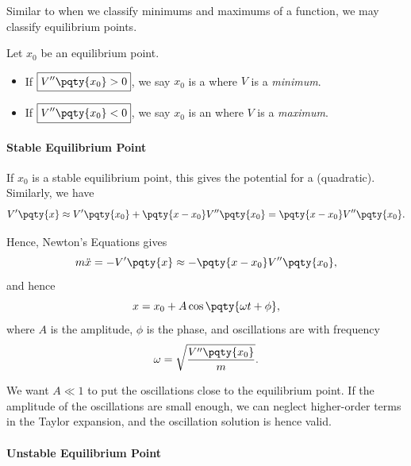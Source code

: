 Similar to when we classify minimums and maximums of a function, we may classify equilibrium points.

\begin{definition}
    \label{def:stable-unstable-equilibrium-points}%
    Let \(x_0\) be an equilibrium point.
    \begin{itemize}
        \item If \(\boxed{V''\pqty{x_0} > 0}\), we say \(x_0\) is a  where \(V\) is a \emph{minimum}.
        \item If \(\boxed{V''\pqty{x_0} < 0}\), we say \(x_0\) is an  where \(V\) is a \emph{maximum}.
    \end{itemize}
    
    
\end{definition}

\paragraph{Stable Equilibrium Point}

If \(x_0\) is a stable equilibrium point, this gives the potential for a  (quadratic). Similarly, we have
\begin{equation}
    V'\pqty{x} \approx V'\pqty{x_0} + \pqty{x - x_0} V''\pqty{x_0} = \pqty{x - x_0} V''\pqty{x_0}.
\end{equation}

Hence, Newton's Equations gives
\begin{equation}
    m \ddot{x} = - V'\pqty{x} \approx - \pqty{x - x_0} V''\pqty{x_0},
\end{equation}
and hence
\begin{equation}
    x = x_0 + A \cos \pqty{\omega t + \phi},
\end{equation}
where \(A\) is the amplitude, \(\phi\) is the phase, and oscillations are with frequency
\begin{equation}
    \omega = \sqrt{\frac{V''\pqty{x_0}}{m}}.
\end{equation}

We want \(A \ll 1\) to put the oscillations close to the equilibrium point. If the amplitude of the oscillations are small enough, we can neglect higher-order terms in the Taylor expansion, and the oscillation solution is hence valid.

\paragraph{Unstable Equilibrium Point}

